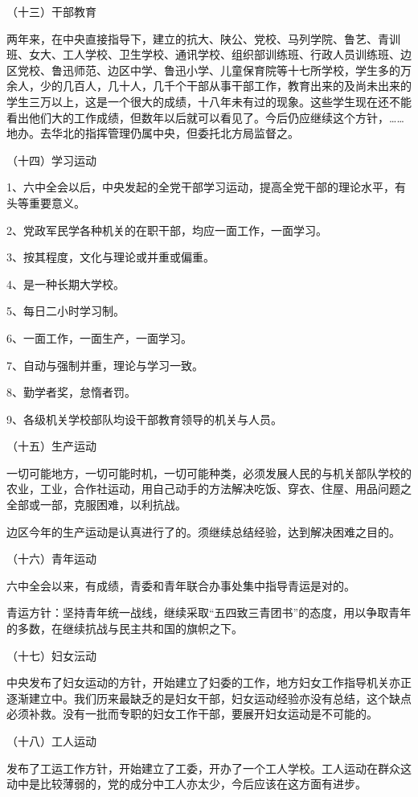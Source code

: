 （十三）干部教育

两年来，在中央直接指导下，建立的抗大、陕公、党校、马列学院、鲁艺、青训班、女大、工人学校、卫生学校、通讯学校、组织部训练班、行政人员训练班、边区党校、鲁迅师范、边区中学、鲁迅小学、儿童保育院等十七所学校，学生多的万余人，少的几百人，几十人，几千个干部从事干部工作，教育出来的及尚未出来的学生三万以上，这是一个很大的成绩，十八年未有过的现象。这些学生现在还不能看出他们大的工作成绩，但数年以后就可以看见了。今后仍应继续这个方针，……地办。去华北的指挥管理仍属中央，但委托北方局监督之。

（十四）学习运动

1、六中全会以后，中央发起的全党干部学习运动，提高全党干部的理论水平，有头等重要意义。

2、党政军民学各种机关的在职干部，均应一面工作，一面学习。

3、按其程度，文化与理论或并重或偏重。

4、是一种长期大学校。

5、每日二小时学习制。

6、一面工作，一面生产，一面学习。

7、自动与强制并重，理论与学习一致。

8、勤学者奖，怠惰者罚。

9、各级机关学校部队均设干部教育领导的机关与人员。

（十五）生产运动

一切可能地方，一切可能时机，一切可能种类，必须发展人民的与机关部队学校的农业，工业，合作社运动，用自己动手的方法解决吃饭、穿衣、住屋、用品问题之全部或一部，克服困难，以利抗战。

边区今年的生产运动是认真进行了的。须继续总结经验，达到解决困难之目的。

（十六）青年运动

六中全会以来，有成绩，青委和青年联合办事处集中指导青运是对的。

青运方针：坚持青年统一战线，继续采取“五四致三青团书”的态度，用以争取青年的多数，在继续抗战与民主共和国的旗帜之下。

（十七）妇女沄动

中央发布了妇女运动的方针，开始建立了妇委的工作，地方妇女工作指导机关亦正逐渐建立中。我们历来最缺乏的是妇女干部，妇女运动经验亦没有总结，这个缺点必须补救。没有一批而专职的妇女工作干部，要展开妇女运动是不可能的。

（十八）工人运动

发布了工运工作方针，开始建立了工委，开办了一个工人学校。工人运动在群众这动中是比较薄弱的，党的成分中工人亦太少，今后应该在这方面有进步。

